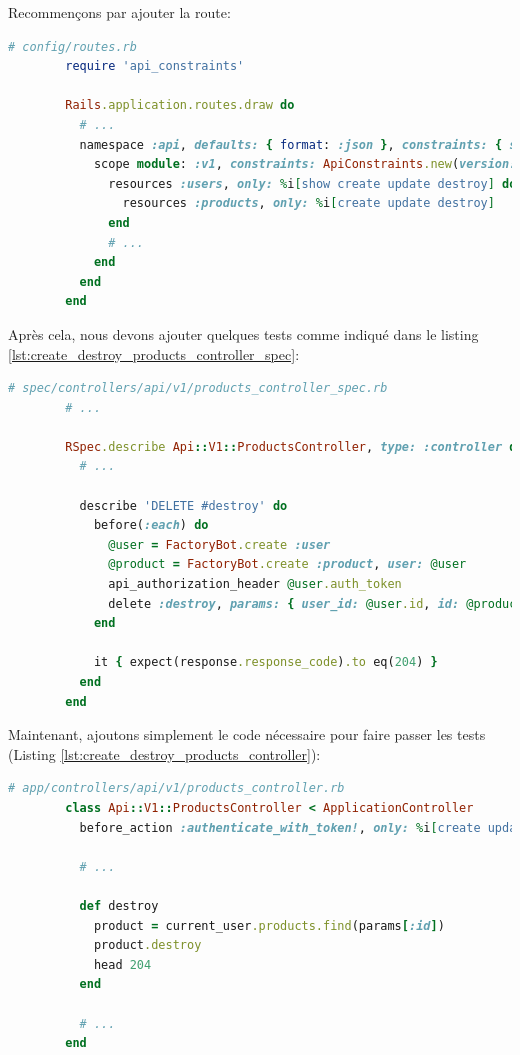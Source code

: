 \documentclass[]{report}
\begin{document}
      Recommençons par ajouter la route:

      \begin{scriptsize}
        \begin{lstlisting}[language=ruby]
        # config/routes.rb
        require 'api_constraints'

        Rails.application.routes.draw do
          # ...
          namespace :api, defaults: { format: :json }, constraints: { subdomain: 'api' }, path: '/' do
            scope module: :v1, constraints: ApiConstraints.new(version: 1, default: true) do
              resources :users, only: %i[show create update destroy] do
                resources :products, only: %i[create update destroy]
              end
              # ...
            end
          end
        end
        \end{lstlisting}
      \end{scriptsize}

      Après cela, nous devons ajouter quelques tests comme indiqué dans le listing \ref{lst:create_destroy_products_controller_spec}:

      \begin{scriptsize}
        \begin{lstlisting}[language=ruby, caption={Test de suppression des produits}, label={lst:create_destroy_products_controller_spec}]
        # spec/controllers/api/v1/products_controller_spec.rb
        # ...

        RSpec.describe Api::V1::ProductsController, type: :controller do
          # ...

          describe 'DELETE #destroy' do
            before(:each) do
              @user = FactoryBot.create :user
              @product = FactoryBot.create :product, user: @user
              api_authorization_header @user.auth_token
              delete :destroy, params: { user_id: @user.id, id: @product.id }
            end

            it { expect(response.response_code).to eq(204) }
          end
        end
        \end{lstlisting}
      \end{scriptsize}

      Maintenant, ajoutons simplement le code nécessaire pour faire passer les tests (Listing \ref{lst:create_destroy_products_controller}):


      \begin{scriptsize}
        \begin{lstlisting}[language=ruby, caption={Implémentation de suppression des produits}, label={lst:create_destroy_products_controller}]
        # app/controllers/api/v1/products_controller.rb
        class Api::V1::ProductsController < ApplicationController
          before_action :authenticate_with_token!, only: %i[create update destroy]

          # ...

          def destroy
            product = current_user.products.find(params[:id])
            product.destroy
            head 204
          end

          # ...
        end
        \end{lstlisting}
      \end{scriptsize}
\end{document}
